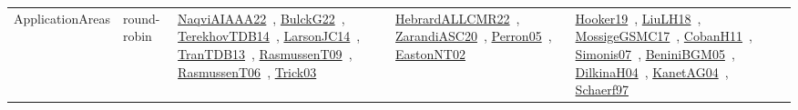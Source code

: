 {\begin{longtable}{lp{3cm}>{\raggedright\arraybackslash}p{6cm}>{\raggedright\arraybackslash}p{6cm}>{\raggedright\arraybackslash}p{8cm}}
\index{round-robin}\index{ApplicationAreas!round-robin}ApplicationAreas & round-robin & \href{../works/NaqviAIAAA22.pdf}{NaqviAIAAA22}~\cite{NaqviAIAAA22}, \href{../works/BulckG22.pdf}{BulckG22}~\cite{BulckG22}, \href{../works/TerekhovTDB14.pdf}{TerekhovTDB14}~\cite{TerekhovTDB14}, \href{../works/LarsonJC14.pdf}{LarsonJC14}~\cite{LarsonJC14}, \href{../works/TranTDB13.pdf}{TranTDB13}~\cite{TranTDB13}, \href{../works/RasmussenT09.pdf}{RasmussenT09}~\cite{RasmussenT09}, \href{../works/RasmussenT06.pdf}{RasmussenT06}~\cite{RasmussenT06}, \href{../works/Trick03.pdf}{Trick03}~\cite{Trick03} & \href{../works/HebrardALLCMR22.pdf}{HebrardALLCMR22}~\cite{HebrardALLCMR22}, \href{../works/ZarandiASC20.pdf}{ZarandiASC20}~\cite{ZarandiASC20}, \href{../works/Perron05.pdf}{Perron05}~\cite{Perron05}, \href{../works/EastonNT02.pdf}{EastonNT02}~\cite{EastonNT02} & \href{../works/Hooker19.pdf}{Hooker19}~\cite{Hooker19}, \href{../works/LiuLH18.pdf}{LiuLH18}~\cite{LiuLH18}, \href{../works/MossigeGSMC17.pdf}{MossigeGSMC17}~\cite{MossigeGSMC17}, \href{../works/CobanH11.pdf}{CobanH11}~\cite{CobanH11}, \href{../works/Simonis07.pdf}{Simonis07}~\cite{Simonis07}, \href{../works/BeniniBGM05.pdf}{BeniniBGM05}~\cite{BeniniBGM05}, \href{../works/DilkinaH04.pdf}{DilkinaH04}~\cite{DilkinaH04}, \href{../works/KanetAG04.pdf}{KanetAG04}~\cite{KanetAG04}, \href{../works/Schaerf97.pdf}{Schaerf97}~\cite{Schaerf97}\\

\end{longtable}}
